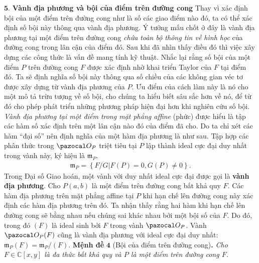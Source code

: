 \begin{multicols}{2}
	\vskip 0.1cm
	$\pmb{5.}$ \textbf{\color{duongvaotoanhoc}Vành địa phương và bội của điểm trên đường cong} 
	\vskip 0.1cm 
	Thay vì xác định bội của một điểm trên đường cong như là số các giao điểm nào đó, ta có thể xác định số bội này thông qua vành địa phương. Ý tưởng mấu chốt ở đây là vành địa phương tại một điểm trên đường cong {\em chứa toàn bộ thông tin về hình học} của đường cong trong lân cận của điểm đó. Sau khi đã nhìn thấy điều đó thì việc xây dựng các công thức là vấn đề mang tính kỹ thuật. 
	\vskip 0.1cm
	Nhắc lại rằng số bội của một điểm $P$ trên đường cong $F$ được xác định nhờ khai triển Taylor của $F$ tại điểm đó. Ta sẽ định nghĩa số bội này thông qua số chiều của các không gian véc tơ được xây dựng từ vành địa phương của $P$.  Ưu điểm của cách làm này là nó cho một mô tả trừu tượng về số bội, cho chúng ta hiểu biết sâu sắc hơn về nó, để từ đó cho phép phát triển những phương pháp hiện đại hơn khi nghiên cứu số bội. 
	\vskip 0.1cm
	{\em Vành địa phương tại một điểm trong mặt phẳng affine} (phức) được hiểu là tập các hàm số xác định trên một lân cận nào đó của điểm đã cho. Do ta chỉ xét các hàm ``đại số'' nên định nghĩa của một hàm địa phương là như sau.
	\vskip 0.1cm
	\vskip 0.1cm
	Tập hợp các phân thức trong $\pazocal O_P$ triệt tiêu tại $P$ lập thành ideal cực đại duy nhất trong vành này, ký hiệu là $\mathfrak m_P$. 
	\begin{align*}
		\mathfrak m_P=\left\{ F/G \left|\right.  F(P)=0, G(P)\neq 0\right\}.
	\end{align*}
	Trong Đại số Giao hoán, một vành với duy nhất ideal cực đại được gọi   là \textbf{\color{duongvaotoanhoc}vành địa phương}.
	\vskip 0.1cm
	Cho $P(a,b)$ là một điểm trên đường cong bất khả quy  $F$. Các hàm địa phương trên mặt phẳng affine tại $P$ khi hạn chế lên đường cong này xác định các hàm địa phương trên đó. Ta nhận thấy rằng hai hàm khi hạn chế lên đường cong sẽ bằng nhau nếu chúng sai khác nhau bởi một bội số của $F$. Do đó, 
	\vskip 0.1cm
	\vskip 0.1cm
	trong đó $(F)$ là ideal sinh bởi $F$ trong vành $\pazocal O_P$.
	Vành $\pazocal O_P(F)$ cũng là vành địa phương với ideal cực đại duy nhất:
	$\mathfrak m_P(F)=\mathfrak m_P/(F).$
	\vskip 0.1cm
	\textbf{\color{duongvaotoanhoc}Mệnh đề} $\pmb{4}$ (Bội của điểm trên đường cong)\textbf{\color{duongvaotoanhoc}.} 
		\textit{Cho $F\in\mathbb C[x,y]$ là đa thức bất khả quy và $P$ là một điểm trên đường cong $F$. 
}
\end{multicols}
